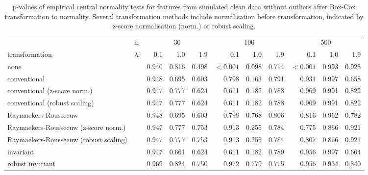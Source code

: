 \documentclass[
  a4paper,
]{article}
\begin{document}
\begin{table}
\begin{center}
\caption{
p-values of empirical central normality tests for features from simulated clean data without outliers after Box-Cox transformation to normality.
Several transformation methods include normalisation before transformation, indicated by z-score normalisation (norm.) or robust scaling.}
\label{tab:clean-transformation-appendix-p-value-bc}
\small{
\begin{tabular}{p{3.5cm} | l r r r r r r r r r}

\toprule
& n: & \multicolumn{3}{c}{30} & \multicolumn{3}{c}{100} & \multicolumn{3}{c}{500} \\
transformation & $\lambda$: & 0.1 & 1.0 & 1.9 & 0.1 & 1.0 & 1.9 & 0.1 & 1.0 & 1.9 \\

\midrule

none                                  & & 0.940 & 0.816 & 0.498 & $<0.001$ & 0.098 & 0.714 & $<0.001$ & 0.993 & 0.928 \\
conventional                          & & 0.948 & 0.695 & 0.603 &   0.798  & 0.163 & 0.791 &   0.931  & 0.997 & 0.658 \\
conventional (z-score norm.)          & & 0.947 & 0.777 & 0.624 &   0.611  & 0.182 & 0.788 &   0.969  & 0.991 & 0.822 \\
conventional (robust scaling)         & & 0.947 & 0.777 & 0.624 &   0.611  & 0.182 & 0.788 &   0.969  & 0.991 & 0.822 \\
Raymaekers-Rousseeuw                  & & 0.948 & 0.695 & 0.603 &   0.798  & 0.768 & 0.806 &   0.816  & 0.962 & 0.782 \\
Raymaekers-Rousseeuw (z-score norm.)  & & 0.947 & 0.777 & 0.753 &   0.913  & 0.255 & 0.784 &   0.775  & 0.866 & 0.921 \\
Raymaekers-Rousseeuw (robust scaling) & & 0.947 & 0.777 & 0.753 &   0.913  & 0.255 & 0.784 &   0.807  & 0.866 & 0.921 \\
invariant                             & & 0.947 & 0.661 & 0.624 &   0.611  & 0.182 & 0.789 &   0.956  & 0.997 & 0.664 \\
robust invariant                      & & 0.969 & 0.824 & 0.750 &   0.972  & 0.779 & 0.775 &   0.956  & 0.934 & 0.840 \\

\bottomrule
\end{tabular}
}
\end{center}
\end{table}
\end{document}
